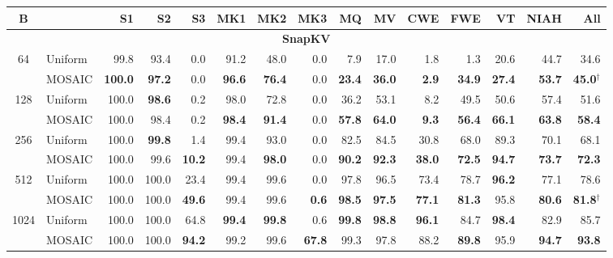 \begin{table}[tp]
  \centering
  \scriptsize
  \setlength{\tabcolsep}{4pt}
  \renewcommand{\arraystretch}{0.92}
  \begin{tabular}{@{} c l rrrrrrrrrrrrr @{}}
    \toprule
    \textbf{B} & & \textbf{S1} & \textbf{S2} & \textbf{S3} & \textbf{MK1} & \textbf{MK2} & \textbf{MK3} & \textbf{MQ} & \textbf{MV} & \textbf{CWE} & \textbf{FWE} & \textbf{VT} & \textbf{NIAH} & \textbf{All} \\
    \midrule
    \multicolumn{15}{c}{\textbf{SnapKV}} \\
    \midrule
    \multirow{2}{*}{64} & Uniform & 99.8 & 93.4 & 0.0 & 91.2 & 48.0 & 0.0 & 7.9 & 17.0 & 1.8 & 1.3 & 20.6 & 44.7 & 34.6 \\
     & MOSAIC & \textbf{100.0} & \textbf{97.2} & 0.0 & \textbf{96.6} & \textbf{76.4} & 0.0 & \textbf{23.4} & \textbf{36.0} & \textbf{2.9} & \textbf{34.9} & \textbf{27.4} & \textbf{53.7} & \textbf{45.0}$^\dagger$ \\
    \cmidrule(l){1-15}
    \multirow{2}{*}{128} & Uniform & 100.0 & \textbf{98.6} & 0.2 & 98.0 & 72.8 & 0.0 & 36.2 & 53.1 & 8.2 & 49.5 & 50.6 & 57.4 & 51.6 \\
     & MOSAIC & 100.0 & 98.4 & 0.2 & \textbf{98.4} & \textbf{91.4} & 0.0 & \textbf{57.8} & \textbf{64.0} & \textbf{9.3} & \textbf{56.4} & \textbf{66.1} & \textbf{63.8} & \textbf{58.4} \\
    \cmidrule(l){1-15}
    \multirow{2}{*}{256} & Uniform & 100.0 & \textbf{99.8} & 1.4 & 99.4 & 93.0 & 0.0 & 82.5 & 84.5 & 30.8 & 68.0 & 89.3 & 70.1 & 68.1 \\
     & MOSAIC & 100.0 & 99.6 & \textbf{10.2} & 99.4 & \textbf{98.0} & 0.0 & \textbf{90.2} & \textbf{92.3} & \textbf{38.0} & \textbf{72.5} & \textbf{94.7} & \textbf{73.7} & \textbf{72.3} \\
    \cmidrule(l){1-15}
    \multirow{2}{*}{512} & Uniform & 100.0 & 100.0 & 23.4 & 99.4 & 99.6 & 0.0 & 97.8 & 96.5 & 73.4 & 78.7 & \textbf{96.2} & 77.1 & 78.6 \\
     & MOSAIC & 100.0 & 100.0 & \textbf{49.6} & 99.4 & 99.6 & \textbf{0.6} & \textbf{98.5} & \textbf{97.5} & \textbf{77.1} & \textbf{81.3} & 95.8 & \textbf{80.6} & \textbf{81.8}$^\dagger$ \\
    \cmidrule(l){1-15}
    \multirow{2}{*}{1024} & Uniform & 100.0 & 100.0 & 64.8 & \textbf{99.4} & \textbf{99.8} & 0.6 & \textbf{99.8} & \textbf{98.8} & \textbf{96.1} & 84.7 & \textbf{98.4} & 82.9 & 85.7 \\
     & MOSAIC & 100.0 & 100.0 & \textbf{94.2} & 99.2 & 99.6 & \textbf{67.8} & 99.3 & 97.8 & 88.2 & \textbf{89.8} & 95.9 & \textbf{94.7} & \textbf{93.8} \\

\end{tabular}
\end{table}

